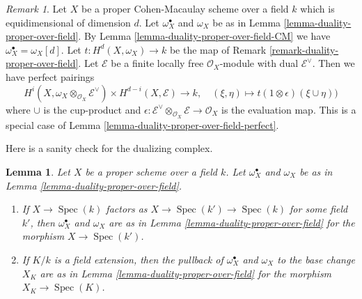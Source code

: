 \documentclass{stacks-project}
\theoremstyle{plain}
\newtheorem{lemma}[subsection]{Lemma}
\theoremstyle{definition}
\theoremstyle{remark}
\newtheorem{remark}[subsection]{Remark}
\numberwithin{equation}{subsection}
\def\Spec{\mathop{\mathrm{Spec}}}
\begin{document}
\begin{remark}
\label{remark-rework-duality-locally-free-CM}
Let $X$ be a proper Cohen-Macaulay scheme over a field $k$
which is equidimensional of dimension $d$.
Let $\omega_X^\bullet$ and $\omega_X$ be as in
Lemma \ref{lemma-duality-proper-over-field}.
By Lemma \ref{lemma-duality-proper-over-field-CM}
we have $\omega_X^\bullet = \omega_X[d]$.
Let $t : H^d(X, \omega_X) \to k$ be the map of
Remark \ref{remark-duality-proper-over-field}.
Let $\mathcal{E}$ be a finite locally free $\mathcal{O}_X$-module
with dual $\mathcal{E}^\vee$. Then we have perfect pairings
$$
H^i(X, \omega_X \otimes_{\mathcal{O}_X} \mathcal{E}^\vee)
\times
H^{d - i}(X, \mathcal{E})
\longrightarrow
k,\quad
(\xi, \eta) \longmapsto t(1 \otimes \epsilon)(\xi \cup \eta))
$$
where $\cup$ is the cup-product and
$\epsilon : \mathcal{E}^\vee \otimes_{\mathcal{O}_X} \mathcal{E}
\to \mathcal{O}_X$ is the evaluation map.
This is a special case of Lemma \ref{lemma-duality-proper-over-field-perfect}.
\end{remark}

\noindent
Here is a sanity check for the dualizing complex.

\begin{lemma}
\label{lemma-sanity-check-duality}
Let $X$ be a proper scheme over a field $k$. Let $\omega_X^\bullet$ and
$\omega_X$ be as in Lemma \ref{lemma-duality-proper-over-field}.
\begin{enumerate}
\item If $X \to \Spec(k)$ factors as $X \to \Spec(k') \to \Spec(k)$
for some field $k'$, then $\omega_X^\bullet$ and $\omega_X$
are as in Lemma \ref{lemma-duality-proper-over-field} for the morphism
$X \to \Spec(k')$.
\item If $K/k$ is a field extension, then the pullback of
$\omega_X^\bullet$ and $\omega_X$ to the base change $X_K$
are as in  Lemma \ref{lemma-duality-proper-over-field} for the morphism
$X_K \to \Spec(K)$.
\end{enumerate}
\end{lemma}
\end{document}
